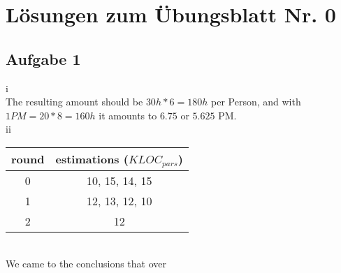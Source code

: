 \documentclass{scrartcl}
\begin{document}
\section*{Lösungen zum Übungsblatt Nr. 0}

\subsection*{Aufgabe 1}

i\\
The resulting amount should be $30h*6=180h$ per Person, and with $1 PM=20*8=160h$ it amounts to $6.75$ or $5.625$ PM.\\


ii\\


\begin{tabular} {| c | c |}
	round & estimations ($KLOC_{pars}$)\\
	\hline
	0 & 10, 15, 14, 15 \\
	1 & 12, 13, 12, 10\\
	2 & 12\\
\end{tabular}\\
We came to the conclusions that over 
\end{document}
